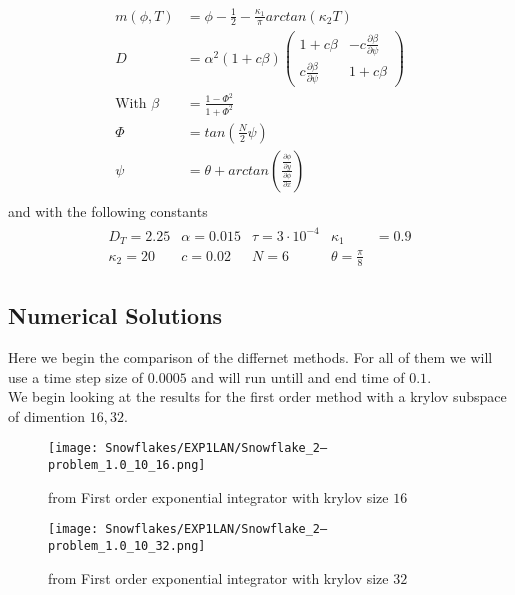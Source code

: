 \begin{align*}
    m(\phi, T) &= \phi - \frac 12 - \frac{\kappa_1}{\pi}arctan(\kappa_2 T)\\
    D &= \alpha^2(1+c\beta)
    \begin{pmatrix}
        1+c\beta & -c\frac{\partial\beta}{\partial\psi}\\
        c\frac{\partial\beta}{\partial\psi} & 1+c\beta
    \end{pmatrix}\\
    \text{With }\beta &= \frac{1-\Phi^2}{1+\Phi^2}\\
    \Phi &= tan(\frac N2\psi)\\
    \psi &= \theta + arctan(\frac{\frac{\partial \phi}{\partial y}}{\frac{\partial \phi}{\partial x}})\\
\end{align*}
and with the following constants
\begin{align*}
    \begin{matrix}
    D_T = 2.25 & \alpha = 0.015 & \tau = 3\cdot 10^{-4} & \kappa_1 &= 0.9\\
    \kappa_2 = 20 & c = 0.02 & N = 6 & \theta = \frac{\pi}8
    \end{matrix}
\end{align*}

\subsection{Numerical Solutions}
Here we begin the comparison of the differnet methods.
For all of them we will use a time step size of $0.0005$ and will run untill and end time of $0.1$.\\

We begin looking at the results for the first order method with a krylov subspace of dimention $16, 32$.

\begin{figure}[H]
    \centering
    \begin{minipage}{0.49\textwidth}
        \texttt{[image: Snowflakes/EXP1LAN/Snowflake\_2--problem\_1.0\_10\_16.png]} %
        \caption{from First order exponential integrator with krylov size $16$}
        \label{fig:first order 16}
    \end{minipage}\hfill
    \centering
    \begin{minipage}{0.49\textwidth}
        \texttt{[image: Snowflakes/EXP1LAN/Snowflake\_2--problem\_1.0\_10\_32.png]} %
        \caption{from First order exponential integrator with krylov size $32$}
        \label{fig:first order 32}
    \end{minipage}\hfill
\end{figure}

